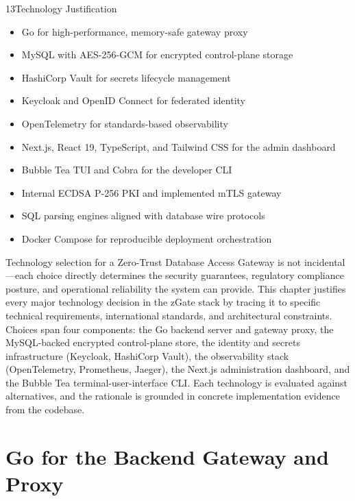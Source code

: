 
\begin{sectionintro}{13}{Technology Justification}{
  \begin{itemize}[leftmargin=1.5em]
    \item Go for high-performance, memory-safe gateway proxy
    \item MySQL with AES-256-GCM for encrypted control-plane storage
    \item HashiCorp Vault for secrets lifecycle management
    \item Keycloak and OpenID Connect for federated identity
    \item OpenTelemetry for standards-based observability
    \item Next.js, React 19, TypeScript, and Tailwind CSS for the admin dashboard
    \item Bubble Tea TUI and Cobra for the developer CLI
    \item Internal ECDSA P-256 PKI and implemented mTLS gateway
    \item SQL parsing engines aligned with database wire protocols
    \item Docker Compose for reproducible deployment orchestration
  \end{itemize}
}
Technology selection for a Zero-Trust Database Access Gateway is not incidental---each choice directly determines the security guarantees, regulatory compliance posture, and operational reliability the system can provide. This chapter justifies every major technology decision in the zGate stack by tracing it to specific technical requirements, international standards, and architectural constraints. Choices span four components: the Go backend server and gateway proxy, the MySQL-backed encrypted control-plane store, the identity and secrets infrastructure (Keycloak, HashiCorp Vault), the observability stack (OpenTelemetry, Prometheus, Jaeger), the Next.js administration dashboard, and the Bubble Tea terminal-user-interface CLI. Each technology is evaluated against alternatives, and the rationale is grounded in concrete implementation evidence from the codebase.
\end{sectionintro}

\section{Go for the Backend Gateway and Proxy}

